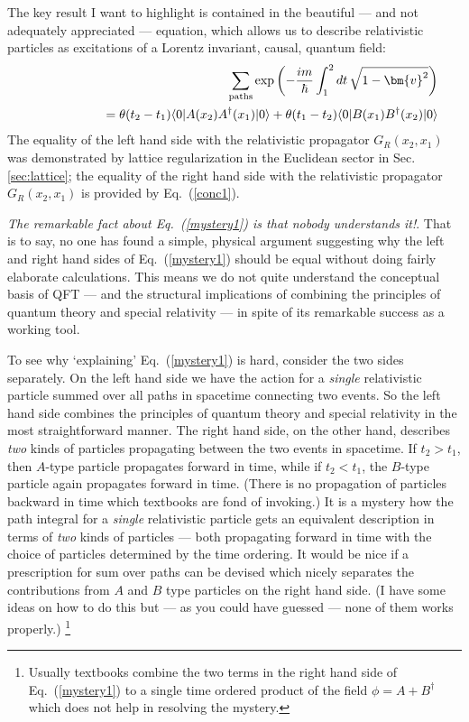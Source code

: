 \documentclass{article}
\def\eq#1{{Eq.~(\ref{#1})}}
\def\bk#1#2#3{{\langle #1|#2|#3\rangle}}  %
\begin{document}
The key result I want to highlight is contained in the beautiful --- and not adequately appreciated --- equation, which allows us to describe  relativistic particles as excitations of a Lorentz invariant, causal, quantum field:
\begin{eqnarray}
 \label{mystery1}
 &&\sum_{\rm paths} \exp\left( - \frac{im}{\hbar} \int_1^2 dt\, \sqrt{1-\bm{v}^2} \right)\\
 &&\hskip5em= \theta(t_2-t_1) \bk{0}{A(x_2)A^\dagger(x_1)}{0} + \theta(t_1-t_2) \bk{0}{B(x_1)B^\dagger(x_2)}{0}\nonumber
\end{eqnarray} 
The equality of the left hand side with the relativistic propagator $G_R(x_2,x_1)$ was demonstrated by lattice regularization in the Euclidean sector in Sec. \ref{sec:lattice}; the equality of the right hand side with the relativistic propagator 
$G_R(x_2,x_1)$ is provided by \eq{conc1}. 

\textit{The remarkable fact about \eq{mystery1} is that nobody understands it!}. That is to say,  no one has found a simple, physical argument suggesting why the left and right hand sides of  \eq{mystery1} should be equal without doing fairly elaborate calculations. This means we do not quite understand the conceptual basis of QFT --- and the structural implications of combining the principles of quantum theory and special relativity --- in spite of its remarkable success as a working tool. 

To see why `explaining' \eq{mystery1} is hard, consider the two sides separately. On the left hand side we have the action for a \textit{single} relativistic particle summed over all paths in spacetime connecting two events. So the left hand side combines the principles of quantum theory and special relativity in the most straightforward manner. The right hand side, on the other hand, describes \textit{two} kinds of particles propagating between the two events in spacetime. If $t_2 > t_1$, then $A$-type particle propagates forward in time, while if $t_2<t_1$, the $B$-type particle again propagates forward in time. (There is no propagation of particles backward in time which textbooks are fond of invoking.) It is a mystery how the path integral for  a \textit{single} relativistic particle gets an equivalent description in terms of \textit{two} kinds of particles --- both propagating forward in time with the choice of particles determined by the time ordering. It would be nice if a prescription for sum over paths can be devised which  nicely separates the contributions from $A$ and $B$ type particles on the right hand side. (I have some ideas on how to do this but --- as you could have guessed --- none of them works properly.) 
\footnote{Usually textbooks combine the two terms in the right hand side of \eq{mystery1} to a single time ordered product of the field $\phi = A + B^\dagger$ which does not help in resolving the mystery.}
\end{document}
